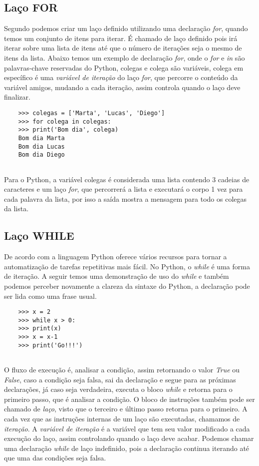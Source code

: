             \subsection{Laço FOR}
	Segundo \cite{Severance2016} podemos criar um laço definido utilizando uma declaração \textit{for}, quando temos um conjunto de itens para iterar. É chamado de laço definido pois irá iterar sobre uma lista de itens até que o número de iterações seja o mesmo de itens da lista. Abaixo temos um exemplo de declaração \textit{for}, onde o \textit{for} e \textit{in} são palavras-chave reservadas do Python, colegas e colega são variáveis, colega em específico é uma \textit{variável de iteração} do laço \textit{for}, que percorre o conteúdo da variável amigos, mudando a cada iteração, assim controla quando o laço deve finalizar.
	\begin{lstlisting}
	>>> colegas = ['Marta', 'Lucas', 'Diego']
	>>> for colega in colegas:
	>>>	print('Bom dia', colega)
	Bom dia Marta
	Bom dia Lucas
	Bom dia Diego
		
	\end{lstlisting}
	Para o Python, a variável colegas é considerada uma lista contendo 3 cadeias de caracteres e um laço \textit{for}, que percorrerá a lista e executará o corpo 1 vez para cada palavra da lista, por isso a saída mostra a mensagem para todo os colegas da lista.
            \subsection{Laço WHILE}
	De acordo com \cite{Severance2016} a linguagem Python oferece vários recursos para tornar a automatização de tarefas repetitivas mais fácil. No Python, o \textit{while} é uma forma de iteração. A seguir temos uma demonstração de uso do \textit{while} e também podemos perceber novamente a clareza da sintaxe do Python, a declaração pode ser lida como uma frase usual.
	\begin{lstlisting}
	>>> x = 2
	>>> while x > 0:
	>>>	print(x)
	>>>	x = x-1
	>>> print('Go!!!')
		
	\end{lstlisting}
	O fluxo de execução é, analisar a condição, assim retornando o valor \textit{True} ou \textit{False}, caso a condição seja falsa, sai da declaração e segue para as próximas declarações, já caso seja verdadeira, executa o bloco \textit{while} e retorna para o primeiro passo, que é analisar a condição. O bloco de instruções também pode ser chamado de \textit{laço}, visto que o terceiro e último passo retorna para o primeiro. A cada vez que as instruções internas de um laço são executadas, chamamos de \textit{iteração}. A \textit{variável de iteração} é a variável que tem seu valor modificado a cada execução do laço, assim controlando quando o laço deve acabar. Podemos chamar uma declaração \textit{while} de laço indefinido, pois a declaração continua iterando até que uma das condições seja falsa.
	
